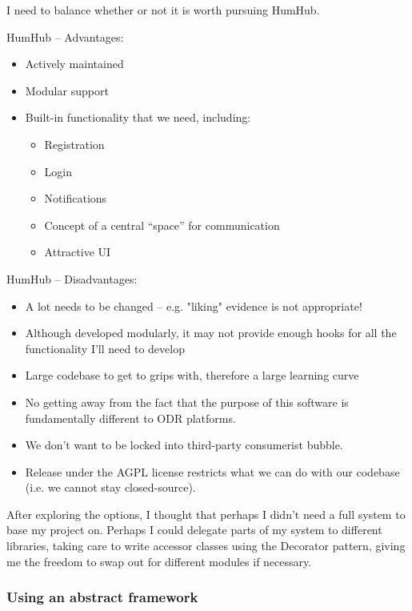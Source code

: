 I need to balance whether or not it is worth pursuing HumHub.

HumHub – Advantages:

\begin{itemize}
    \item Actively maintained
    \item Modular support
    \item Built-in functionality that we need, including:
    \begin{itemize}
        \item Registration
        \item Login
        \item Notifications
        \item Concept of a central “space” for communication
        \item Attractive UI
    \end{itemize}
\end{itemize}


HumHub – Disadvantages:

\begin{itemize}
    \item A lot needs to be changed – e.g. "liking" evidence is not appropriate!
    \item Although developed modularly, it may not provide enough hooks for all the functionality I'll need to develop
    \item Large codebase to get to grips with, therefore a large learning curve
    \item No getting away from the fact that the purpose of this software is fundamentally different to ODR platforms.
    \item We don't want to be locked into third-party consumerist bubble.
    \item Release under the AGPL license restricts what we can do with our codebase (i.e. we cannot stay closed-source).
\end{itemize}

After exploring the options, I thought that perhaps I didn't need a full system to base my project on. Perhaps I could delegate parts of my system to different libraries, taking care to write accessor classes using the Decorator pattern, giving me the freedom to swap out for different modules if necessary.

\subsubsection{Using an abstract framework}

